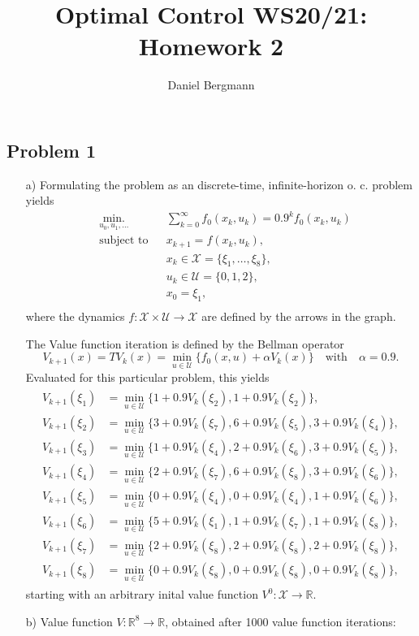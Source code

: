 \documentclass[]{article}
\title{Optimal Control WS20/21: Homework 2}
\author{Daniel Bergmann}
\newcommand{\xnull}{x_0}
\newcommand{\xk}{x_k}
\newcommand{\uk}{u_k}
\newcommand{\xkplus}{x_{k+1}}
\newcommand{\R}{\mathbb{R}}
\newcommand{\fnull}{f_0}
\newcommand{\X}{\mathcal{X}}
\newcommand{\U}{\mathcal{U}}
\newcommand{\writeset}[1]{\{#1\}}
\newcommand{\Vk}{V_k}
\newcommand{\Vind}[1]{V^#1}
\newcommand{\Vnull}{\Vind{0}}
\newcommand{\Vkplus}{V_{k+1}}
\newcommand{\minVit}[6]{\min_{u \in \U} \writeset{#1+0.9\Vk(\xi_{#2}), #3+0.9\Vk(\xi_{#4}),#5+0.9\Vk(\xi_#6) }}
\begin{document}
\maketitle

\subsection*{Problem 1}
		\begin{enumerate}
			\item[a)] Formulating the problem as an discrete-time, infinite-horizon o. c. problem yields
				\begin{equation}
				\begin{aligned}
				& \underset{u_0,u_1,\dots}{\text{min.}}
				& & \sum_{k=0}^{\infty} \fnull(\xk,\uk) =  0.9^k \fnull(\xk,\uk)\\
				& \text{subject to}
				& & \xkplus = f(\xk,\uk),\\
				& & & \xk \in \X = \writeset{\xi_1,\dots,\xi_8},\\
				& & & \uk \in \U = \writeset{0,1,2},\\
				& & &\xnull = \xi_1,\\ 
				\end{aligned}
				\end{equation}
				where the dynamics $ f: \X \times \U \longrightarrow \X $ are defined by the arrows in the graph.
				
				The Value function iteration is defined by the Bellman operator
				\begin{equation} \label{eq:BellmanOp}
					\Vkplus(x) = T\Vk(x) = \underset{u \in \U}{\min} \writeset{\fnull(x,u) + \alpha \Vk(x)}  \quad \text{with} \quad \alpha= 0.9.
				\end{equation}
				Evaluated for this particular problem, this yields
				\begin{align}
					\begin{split}
						\Vkplus(\xi_1) &= \min_{u \in \U} \writeset{1+0.9 \Vk(\xi_2),1+0.9\Vk(\xi_2)},\\
						\Vkplus(\xi_2) &= \min_{u \in \U} \writeset{3+0.9 \Vk(\xi_7),6+0.9\Vk(\xi_5),3+0.9\Vk(\xi_4)},\\
						\Vkplus(\xi_3) &= \min_{u \in \U} \writeset{1+0.9\Vk(\xi_4), 2+0.9\Vk(\xi_6),3+0.9\Vk(\xi_5) },\\
						\Vkplus(\xi_4) &= \minVit{2}{7}{6}{8}{3}{6},\\
						\Vkplus(\xi_5) &= \minVit{0}{4}{0}{4}{1}{6},\\
						\Vkplus(\xi_6) &= \minVit{5}{1}{1}{7}{1}{8},\\
						\Vkplus(\xi_7) &= \minVit{2}{8}{2}{8}{2}{8},\\
						\Vkplus(\xi_8) &= \minVit{0}{8}{0}{8}{0}{8},
					\end{split}
				\end{align}
				starting with an arbitrary inital value function $ \Vnull: \X \longrightarrow \R $.
			\item[b)]
				Value function $ V:\R^8 \longrightarrow \R $, obtained after 1000 value function iterations:\\
				

\end{enumerate}
\end{document}
